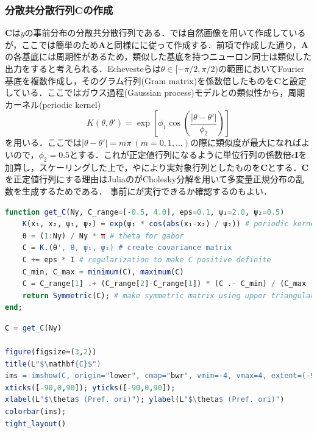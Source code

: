 \subsubsection{分散共分散行列$\mathbf{C}$の作成}
$\mathbf{C}$は$y$の事前分布の分散共分散行列である．\citep{Orban2016-tm}では自然画像を用いて作成しているが，ここでは簡単のため$\mathbf{A}$と同様に\citep{Echeveste2020-sh}に従って作成する．前項で作成した通り，$\mathbf{A}$の各基底には周期性があるため，類似した基底を持つニューロン同士は類似した出力をすると考えられる．Echevesteらは$\theta\in[-\pi/2, \pi/2)$の範囲においてFourier基底を複数作成し，そのグラム行列(Gram matrix)を係数倍したものを$\mathbf{C}$と設定している．ここではガウス過程(Gaussian process)モデルとの類似性から，周期カーネル(periodic kernel) 
\begin{equation}
K(\theta, \theta')=\exp\left[\phi_1 \cos \left(\dfrac{|\theta-\theta'|}{\phi_2}\right)\right]
\end{equation}
を用いる．ここでは$|\theta-\theta'|=m\pi\ (m=0,1,\ldots)$の際に類似度が最大になればよいので，$\phi_2=0.5$とする．これが正定値行列になるように単位行列の係数倍$\epsilon\mathbf{I}$を加算し，スケーリングした上で，やにより実対象行列としたものを$\mathbf{C}$とする．$\mathbf{C}$を正定値行列にする理由はJuliaのがCholesky分解を用いて多変量正規分布の乱数を生成するためである． 事前にが実行できるか確認するのもよい．
\begin{lstlisting}[language=julia]
function get_C(Ny, C_range=[-0.5, 4.0], eps=0.1, ψ₁=2.0, ψ₂=0.5)
    K(x₁, x₂, ψ₁, ψ₂) = exp(ψ₁ * cos(abs(x₁-x₂) / ψ₂)) # periodic kernel
    θ = (1:Ny) / Ny * π # theta for gabor
    C = K.(θ', θ, ψ₁, ψ₂) # create covariance matrix
    C += eps * I # regularization to make C positive definite
    C_min, C_max = minimum(C), maximum(C)
    C = C_range[1] .+ (C_range[2]-C_range[1]) * (C .- C_min) / (C_max - C_min)
    return Symmetric(C); # make symmetric matrix using upper triangular matrix
end;
\end{lstlisting}
\begin{lstlisting}[language=julia]
C = get_C(Ny)

figure(figsize=(3,2))
title(L"$\mathbf{C}$")
ims = imshow(C, origin="lower", cmap="bwr", vmin=-4, vmax=4, extent=(-90, 90, -90, 90))
xticks([-90,0,90]); yticks([-90,0,90]); 
xlabel(L"$\theta$ (Pref. ori)"); ylabel(L"$\theta$ (Pref. ori)")
colorbar(ims);
tight_layout()
\end{lstlisting}
